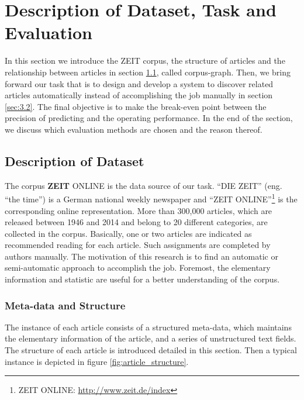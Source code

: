 \section{Description of Dataset, Task and Evaluation}
\label{sec:3}

In this section we introduce the ZEIT corpus, the structure of articles and the relationship between articles in section \ref{sec:3.1}, called corpus-graph. Then, we bring forward our task that is to design and develop a system to discover related articles automatically instead of accomplishing the job manually in section \ref{sec:3.2}. The final objective is to make the break-even point between the precision of predicting and the operating performance. In the end of the section, we discuss which evaluation methods are chosen and the reason thereof. 

\bigbreak
\subsection{Description of Dataset}
\label{sec:3.1}

The corpus \textbf{ZEIT} ONLINE is the data source of our task. ``DIE ZEIT'' (eng. ``the time'') is a German national weekly newspaper and ``ZEIT ONLINE''\footnote{ZEIT ONLINE: \url{http://www.zeit.de/index}} is the corresponding online representation. More than 300,000 articles, which are released between 1946 and 2014 and belong to 20 different categories, are collected in the corpus. Basically, one or two articles are indicated as recommended reading for each article. Such assignments are completed by authors manually. The motivation of this research is to find an automatic or semi-automatic approach to accomplish the job. Foremost, the elementary information and statistic are useful for a better understanding of the corpus. 

\subsubsection{Meta-data and Structure}
\label{sec:3structure}

The instance of each article consists of a structured meta-data, which maintains the elementary information of the article, and a series of unstructured text fields. The structure of each article is introduced detailed in this section. Then a typical instance is depicted in figure \ref{fig:article_structure}.

